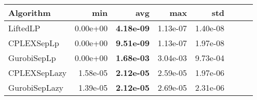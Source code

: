 \begin{tabular}{lrrrrrrr}
Algorithm & min & avg & max & std
\\
\hline
LiftedLP&0.00e+00& \bf4.18e-09& 1.13e-07& 1.40e-08\\
CPLEXSepLp&0.00e+00& \bf9.51e-09& 1.13e-07& 1.97e-08\\
GurobiSepLp&0.00e+00& \bf1.68e-03& 3.04e-03& 9.73e-04\\
CPLEXSepLazy&1.58e-05& \bf2.12e-05& 2.59e-05& 1.97e-06\\
GurobiSepLazy&1.39e-05& \bf2.12e-05& 2.69e-05& 2.31e-06
\end{tabular}
